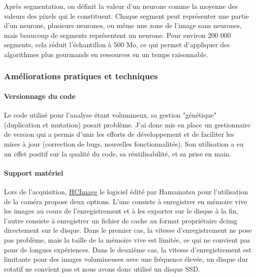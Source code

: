 
Après segmentation, on définit la valeur d'un neurone comme la moyenne des valeurs des pixels qui le constituent. Chaque segment peut représenter une partie d'un neurone, plusieurs neurones, ou même une zone de l'image sans neurones, mais beaucoup de segments représentent un neurone. Pour environ 200 000 segments, cela réduit l'échantillon à 500 Mo, ce qui permet d'appliquer des algorithmes plus gourmands en ressources en un temps raisonnable.




\subsubsection{Améliorations pratiques et techniques}

\paragraph{Versionnage du code}
Le code utilisé pour l'analyse étant volumineux, sa gestion "génétique" (duplication et mutation) posait problème. J'ai donc mis en place un gestionnaire de version qui a permis d'unir les efforts de développement et de faciliter les mises à jour (correction de bugs, nouvelles fonctionnalités). Son utilisation a eu un effet positif sur la qualité du code, sa réutilisabilité, et sa prise en main. 

\paragraph{Support matériel}
Lors de l'acquisition, \href{https://hcimage.com/}{HCImage} le logiciel édité par Hamamatsu pour l'utilisation de la caméra propose deux options. L'une consiste à enregistrer en mémoire vive les images au cours de l'enregistrement et à les exporter sur le disque à la fin, l'autre consiste à enregistrer un fichier de cache au format propriétaire dcimg directement sur le disque. Dans le premier cas, la vitesse d'enregistrement ne pose pas problème, mais la taille de la mémoire vive est limitée, ce qui ne convient pas pour de longues expériences. Dans le deuxième cas, la vitesse d'enregistrement est limitante pour des images volumineuses avec une fréquence élevée, un disque dur rotatif ne convient pas et nous avons donc utilisé un disque SSD.


